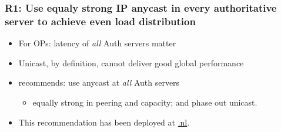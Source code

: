 \documentclass[11pt,show 
notes,notheorems,noamsthm,blank]{beamer} %
\begin{document}
\begin{frame}
 \frametitle{R1: Use equaly strong IP anycast in every authoritative server to
    achieve even load distribution}
    
    
    
\begin{figure}
\centering

  
  \label{fig:nl-deployment}

\end{figure}
\vspace{-0.5cm}
\begin{itemize}
 \item For OPs: latency of \textit{all} Auth servers matter
  \item Unicast, by definition, cannot deliver good global performance 
  \item \cite{Mueller17b} recommends: use anycast at \textit{all} Auth servers
\begin{itemize}
 \item equally strong in peering and capacity; and phase out unicast.
\end{itemize}

\item This recommendation has been deployed at \url{.nl}.
\end{itemize}


\end{frame}
\end{document}
